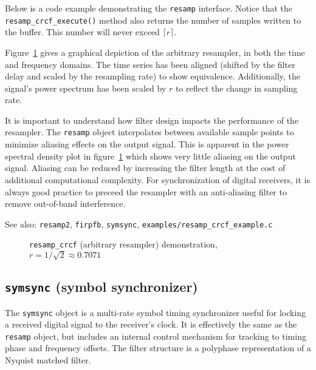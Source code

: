 Below is a code example demonstrating the {\tt resamp} interface.
Notice that the {\tt resamp\_crcf\_execute()} method also returns the number
of samples written to the buffer.
This number will never exceed $\lceil r \rceil$.



Figure~\ref{fig:module:filter:resamp_crcf} gives a graphical depiction of the
arbitrary resampler, in both the time and frequency domains.
The time series has been aligned (shifted by the filter delay and scaled by
the resampling rate) to show equivalence.
Additionally, the signal's power spectrum has been scaled by $r$ to reflect
the change in sampling rate.

It is important to understand how filter design impacts the performance of the
resampler.
The {\tt resamp} object interpolates between available sample points to
minimize aliasing effects on the output signal.
This is apparent in the power spectral density plot in
figure~\ref{fig:module:filter:resamp_crcf} which shows very little aliasing on
the output signal.
Aliasing can be reduced by increasing the filter length at the cost of
additional computational complexity.
For synchronization of digital receivers, it is always good practice to
preceed the resampler with an anti-aliasing filter to remove out-of-band
interference.

See also: {\tt resamp2}, {\tt firpfb}, {\tt symsync},
{\tt examples/resamp\_crcf\_example.c}

\begin{figure}
\centering
{}
\caption{{\tt resamp\_crcf} (arbitrary resampler) demonstration,
$r=1/\sqrt{2}\approx0.7071$}
\label{fig:module:filter:resamp_crcf}
\end{figure}

\subsection{{\tt symsync} (symbol synchronizer)}
The {\tt symsync} object is a multi-rate symbol timing synchronizer useful for
locking a received digital signal to the receiver's clock.
It is effectively the same as the {\tt resamp} object, but includes an
internal control mechanism for tracking to timing phase and frequency offsets.
The filter structure is a polyphase representation of a Nyquist matched
filter.


